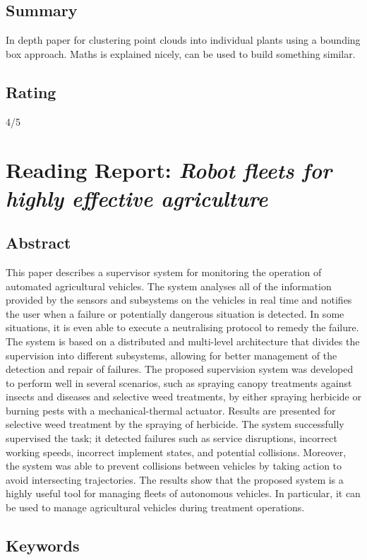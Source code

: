 \subsection*{Summary}
In depth paper for clustering point clouds into individual plants using a bounding box approach.
Maths is explained nicely, can be used to build something similar.

\subsection*{Rating}
4/5

\section{Reading Report: \emph{Robot fleets for highly effective agriculture}}
\cite{ConesaMunoz2015}

\subsection*{Abstract}
This paper describes a supervisor system for monitoring the operation of automated
agricultural vehicles. The system analyses all of the information provided by the sensors and
subsystems on the vehicles in real time and notifies the user when a failure or potentially
dangerous situation is detected. In some situations, it is even able to execute a neutralising
protocol to remedy the failure. The system is based on a distributed and multi-level architecture
that divides the supervision into different subsystems, allowing for better management of the
detection and repair of failures. The proposed supervision system was developed to perform
well in several scenarios, such as spraying canopy treatments against insects and diseases
and selective weed treatments, by either spraying herbicide or burning pests with a
mechanical-thermal actuator. Results are presented for selective weed treatment by the
spraying of herbicide. The system successfully supervised the task; it detected failures such
as service disruptions, incorrect working speeds, incorrect implement states, and potential
collisions. Moreover, the system was able to prevent collisions between vehicles by taking
action to avoid intersecting trajectories. The results show that the proposed system is a highly
useful tool for managing fleets of autonomous vehicles. In particular, it can be used to
manage agricultural vehicles during treatment operations.

\subsection*{Keywords}

